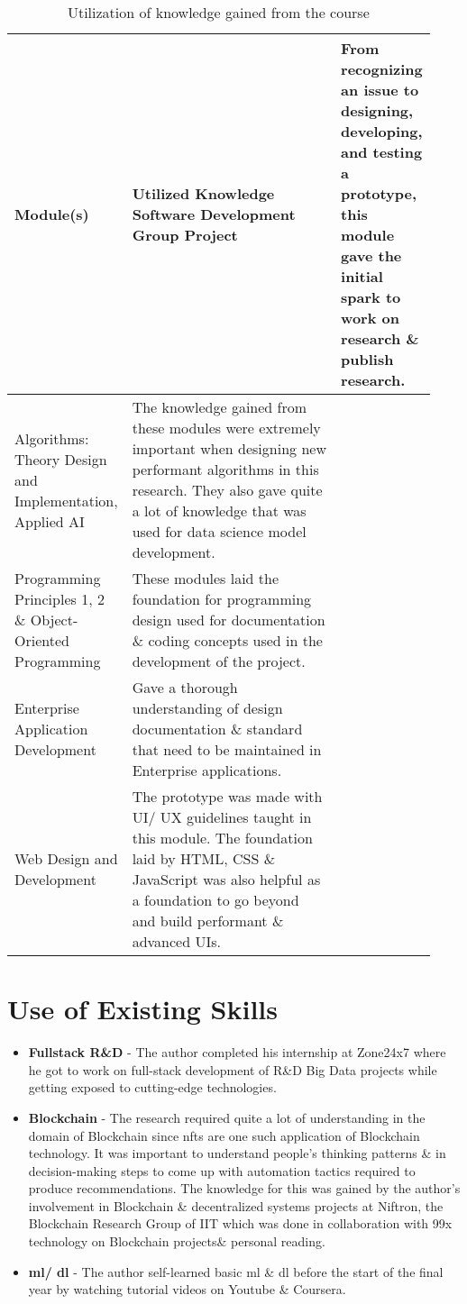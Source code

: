 \vspace{-4mm}
\begin{longtable}{|p{0.25\linewidth}|p{0.68\linewidth}|}
\caption{Utilization of knowledge gained from the course}\\ 
\hline
\textbf{Module(s)} & \textbf{Utilized Knowledge}\endfirsthead 
\hline
Software Development Group Project & From recognizing an issue to designing, developing, and testing a prototype, this module gave the initial spark to work on research \& publish research. \\
\hline
Algorithms: Theory Design and Implementation, Applied AI & The knowledge gained from these modules were extremely important when designing new performant algorithms in this research. They also gave quite a lot of knowledge that was used for data science model development. \\
\hline
Programming Principles 1, 2 \& Object-Oriented Programming & These modules laid the foundation for programming design used for documentation \& coding concepts used in the development of the project. \\
\hline
Enterprise Application Development & Gave a thorough understanding of design documentation \& standard that need to be maintained in Enterprise applications. \\
\hline
Web Design and Development & The prototype was made with UI/ UX guidelines taught in this module. The foundation laid by HTML, CSS \& JavaScript was also helpful as a foundation to go beyond and build performant \& advanced UIs. \\
\hline
\end{longtable}


\section{Use of Existing Skills}
\begin{itemize}
\item \textbf{Fullstack R\&D} - The author completed his internship at Zone24x7 where he got to work on full-stack development of R\&D Big Data projects while getting exposed to cutting-edge technologies.
\item \textbf{Blockchain} - The research required quite a lot of understanding in the domain of Blockchain since \gls{nft}s are one such application of Blockchain technology. It was important to understand people's thinking patterns \& in decision-making steps to come up with automation tactics required to produce recommendations. The knowledge for this was gained by the author's involvement in Blockchain \& decentralized systems projects at Niftron, the Blockchain Research Group of IIT which was done in collaboration with 99x technology on Blockchain projects\& personal reading.
\item \textbf{\gls{ml}/ \gls{dl}} - The author self-learned basic \gls{ml} \& \gls{dl} before the start of the final year by watching tutorial videos on Youtube \& Coursera.
\end{itemize}


